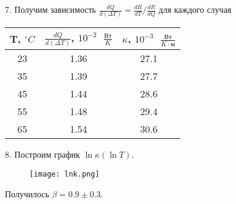 7. Получим зависимость $\frac{dQ}{d(\Delta T)} = \frac{dR}{dT} / \frac{dR}{dQ}$ для каждого случая
\begin{table}[h]
\centering
\begin{tabular}{|c|c|c|}
    \hline
    T, $^\circ C$ & $\frac{dQ}{d(\Delta T)}$, $10^{-2} \text{ } \frac{\text{Вт}}{K} $ & $\kappa$, $10^{-3}\text{ }\frac{\text{Вт}}{K \cdot \text{м}}$\\
    \hline
    23 & 1.36 & 27.1 \\
    \hline
    35 & 1.39 & 27.7 \\
    \hline
    45 & 1.44 & 28.6 \\
    \hline
    55 & 1.48 & 29.4 \\
    \hline
    65 & 1.54 & 30.6 \\
    \hline
\end{tabular}
\end{table}

8. Построим график $\ln\kappa(\ln T)$.
\begin{figure}[h]
    \texttt{[image: lnk.png]}
\end{figure}
Получилось $\beta = 0.9 \pm 0.3$.
